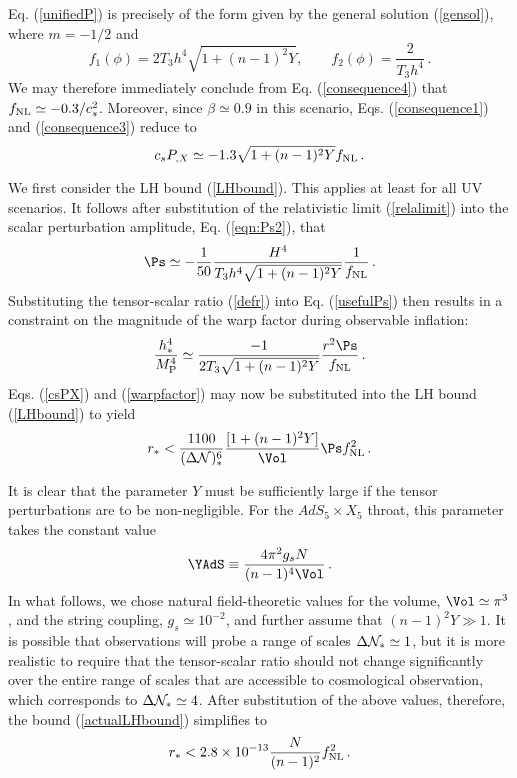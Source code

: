 Eq. (\ref{unifiedP}) is precisely of the form given by the 
general solution (\ref{gensol}), where $m=-1/2$ and 
\begin{equation}
\label{f1}
f_1 (\phi) = 2T_3 h^4 \sqrt{1+(n-1)^2Y} , \qquad 
f_2 (\phi) = \frac{2}{T_3 h^4} \,.
\end{equation}
We may therefore immediately conclude from Eq. (\ref{consequence4}) that $f_{\mathrm{NL}}
\simeq -0.3/c_s^2$. Moreover, since $\beta \simeq 0.9$ in this scenario, 
Eqs. (\ref{consequence1}) and (\ref{consequence3}) reduce to  
\begin{equation}
\label{csPX}
c_sP_{,X} \simeq -1.3 \sqrt{1+(n-1)^2Y} f_{\mathrm{NL}} \,.
\end{equation}

We first consider the LH bound (\ref{LHbound}). This applies at least for all
UV scenarios. It follows after substitution of the relativistic limit
(\ref{relalimit}) into the scalar perturbation amplitude, Eq. (\ref{eqn:Ps2}),
that 
\begin{equation}
\label{usefulPs}
\Ps \simeq -\frac{1}{50} \frac{H^4}{T_3 h^4\sqrt{1+(n-1)^2Y}}
\frac{1}{\fnl}\,.
\end{equation}
Substituting the tensor-scalar ratio (\ref{defr}) into  
Eq. (\ref{usefulPs}) then results in a constraint on the magnitude of 
the warp factor during observable inflation: 
\begin{equation}
\label{warpfactor}
\frac{h^4_*}{\MP^4} \simeq \frac{-1}{2 T_3 \sqrt{1+(n-1)^2Y}} 
\frac{r^2 \Ps}{\fnl} \,.
\end{equation}
Eqs. (\ref{csPX}) and (\ref{warpfactor}) may now be substituted into 
the LH bound (\ref{LHbound}) to yield 
\begin{equation}
\label{actualLHbound}
r_* < \frac{1100}{(\Delta {\cal{N}} )_*^6} 
\frac{[1+(n-1)^2Y]}{\Vol} \Ps \fnl^2 \,.
\end{equation}

It is clear that the parameter $Y$ 
must be sufficiently large if the tensor perturbations 
are to be non-negligible. For the $AdS_5 \times X_5$ throat, this parameter  
takes the constant value    
\begin{equation}
\label{eqn:YAds}
\YAdS \equiv \frac{4\pi^2 g_s N}{(n-1)^4 \Vol} \,.
\end{equation}
In what follows, we chose natural field-theoretic values for the volume, 
$\Vol \simeq \pi^3$, and the string coupling, 
$g_s \simeq 10^{-2}$, and further assume that 
$(n-1)^2 Y \gg 1$. It is possible that observations will probe a 
range of scales $\Delta {\cal{N}}_* \simeq 1$, 
but it is more realistic to require that 
the tensor-scalar ratio should not change significantly over the 
entire range of scales that are accessible to cosmological observation,  
which corresponds to $\Delta {\cal{N}}_* \simeq 4$.
After substitution of the above values, therefore, 
the bound (\ref{actualLHbound}) simplifies to 
\begin{equation}
\label{adsupperbound}
r_* < 2.8 \times 10^{-13} \frac{N}{(n-1)^2} f_{\mathrm{NL}}^2 \,.
\end{equation}

